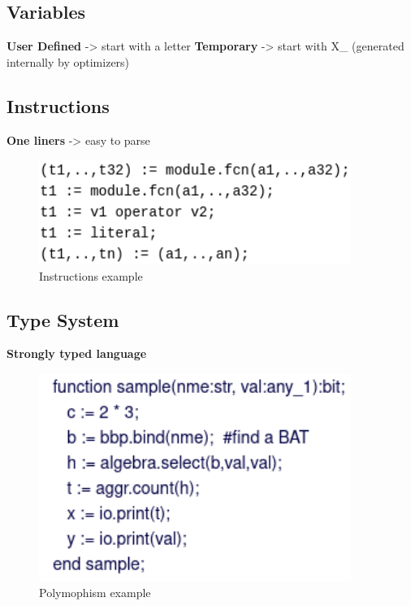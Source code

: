 \documentclass[11pt]{article}
\begin{document}
\subsection{Variables}
\label{sec:org6265c4a}

\textbf{User Defined} -> start with a letter
\textbf{Temporary}    -> start with X\_ (generated internally by optimizers)

\subsection{Instructions}
\label{sec:org823cf8d}

\textbf{One liners}   -> easy to parse

\begin{figure}[htbp]
\centering
\includegraphics[width=4.0in]{./Pictures/instructions-ex.png}
\caption{\label{fig:orgf0444ea}
Instructions example}
\end{figure}

\subsection{Type System}
\label{sec:org959fffa}

\textbf{Strongly typed language}

\begin{figure}[htbp]
\centering
\includegraphics[width=4.0in]{./Pictures/poly-ex.png}
\caption{\label{fig:orgfac603f}
Polymophism example}
\end{figure}
\end{document}
